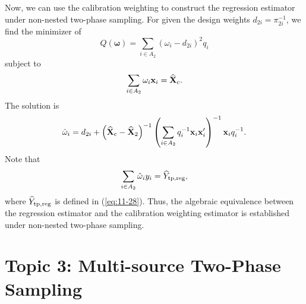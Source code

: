 \documentclass[12pt]{article}
\newcommand{\bx}{\mathbf{x}}
\begin{document}
Now, we can use the calibration weighting to construct the regression estimator under non-nested two-phase sampling. For  given the design weights $d_{2i} = \pi_{2i}^{-1}$, we find the minimizer of 
    $$Q \left( {\bm \omega } \right) = \sum_{i \in A_2} \left(  {\omega_i} - d_{2i}  \right)^2 q_i $$
    subject to 
    $$ \sum_{i \in A_2} {\omega_i} \bx_i = \widehat{\mathbf{X}}_{\rm c} .$$
    The solution is 
    $$ \hat{\omega}_i = d_{2i} + \left( \widehat{\mathbf{X}}_{\rm c} - \widehat{\mathbf{X}}_{\rm 2} \right)^{-1} \left( \sum_{i \in A_2} q_i^{-1} \bx_i \bx_i' \right)^{-1} \bx_i q_i^{-1} . $$
     Note that 
    $$ \sum_{i \in A_2} \hat{\omega}_i y_i = \widehat{Y}_{\rm tp, reg} , $$
    where  $\widehat{Y}_{\rm tp, reg}$ is defined in (\ref{eq:11-28}). 
    Thus, the algebraic equivalence between the  regression estimator and the calibration weighting estimator is established under non-nested two-phase sampling. 


\section*{Topic 3: Multi-source Two-Phase Sampling}




\end{document}
